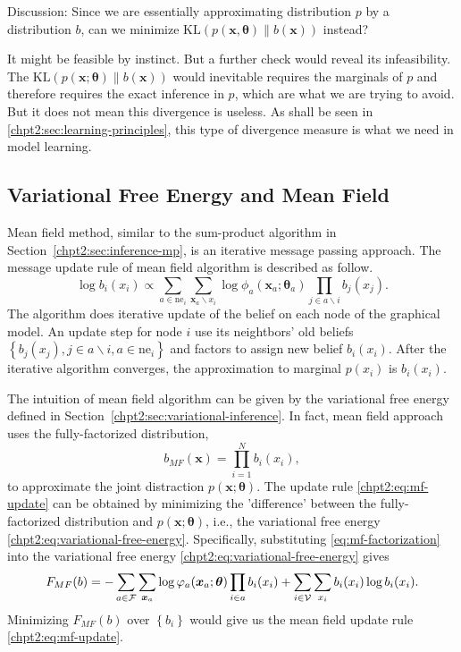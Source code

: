 \begin{remark}
  Discussion: Since we are essentially approximating distribution $p$ by a distribution $b$, can we minimize $\mathrm{KL}(p(\bm{x}, \bm{\theta})\|b(\bm{x}))$ instead?

  It might be feasible by instinct. But a further check would reveal its infeasibility. The $\mathrm{KL}(p(\bm{x}; \bm{\theta})\|b(\bm{x}))$ would inevitable requires the marginals of $p$ and therefore requires the exact inference in $p$, which are what we are trying to avoid. But it does not mean this divergence is useless. As shall be seen in \autoref{chpt2:sec:learning-principles}, this type of divergence measure is what we need in model learning.
\end{remark}



\subsection{Variational Free Energy and Mean Field}

Mean field method, similar to the sum-product algorithm in Section~\ref{chpt2:sec:inference-mp}, is an iterative message passing approach. 
The message update rule of mean field algorithm is described as follow.
\begin{equation}\label{chpt2:eq:mf-update}
  \log{b_i(x_i)} \propto \sum_{a \in \mathrm{ne}_i} \sum_{\bm{x}_{a} \backslash x_i} \log{\phi_{a}}(\bm{x}_{a};\bm{\theta}_{a}) \prod_{j\in {a}\backslash i} b_j(x_j).
\end{equation}
The algorithm does iterative update of the belief on each node of the graphical model. An update step for node $i$ use its neightbors' old  beliefs  $\left\{ b_j(x_j), j\in {a}\backslash i, a \in \mathrm{ne}_i \right\}$ and factors to assign new belief $b_i(x_i)$. After the iterative algorithm converges, the approximation to marginal $p(x_i)$ is $b_i(x_i)$.


The intuition of mean field algorithm can be given by the variational free energy defined in Section~\ref{chpt2:sec:variational-inference}. In fact, mean field approach uses the fully-factorized distribution,
\begin{equation}\label{eq:mf-factorization}
  b_{MF}(\bm{x}) = \prod_{i=1}^{N}b_i(x_i),
\end{equation}
to approximate the joint distraction $p(\bm{x};\bm{\theta})$. The update rule \eqref{chpt2:eq:mf-update} can be obtained by minimizing the 'difference' between the fully-factorized distribution and $p(\bm{x};\bm{\theta})$, i.e., the variational free energy \eqref{chpt2:eq:variational-free-energy}. Specifically,
substituting \eqref{eq:mf-factorization} into the variational free energy \eqref{chpt2:eq:variational-free-energy} gives
\begin{align}
  F_{MF}(b) =  - \sum_{a \in \mathcal{F}}\sum_{\bm{x}_{a}} \log{\varphi_{a}(\bm{x}_{a};\bm{\theta})}
  \prod_{i\in a}b_i(x_i) + \sum_{i \in \mathcal{V}} \sum_{x_i} b_i(x_i) \log{b_i(x_i)}.
\end{align}
Minimizing $F_{MF}(b)$ over $\left\{ b_i \right\}$ would give us the mean field update rule \eqref{chpt2:eq:mf-update}.

